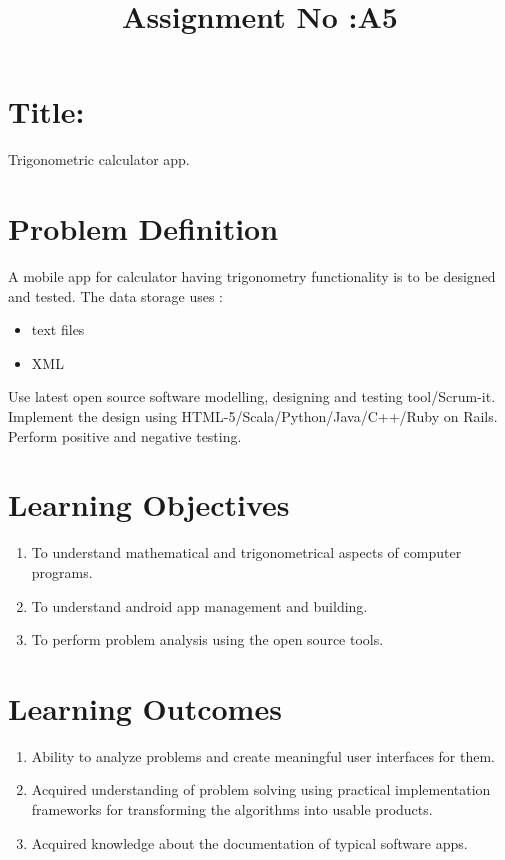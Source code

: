 \documentclass[10pt,a4paper]{article}
\title{Assignment No :A5}
\date{}
\begin{document}
\maketitle
\section{Title:}
Trigonometric calculator app.

\section{Problem Definition}
A mobile app for calculator having trigonometry functionality is to be designed and tested. The data storage uses :
\begin{itemize}
\item text files
\item XML
\end{itemize}
Use latest open source software modelling, designing and testing tool/Scrum-it. Implement the design using HTML-5/Scala/Python/Java/C++/Ruby on Rails. Perform positive and negative testing.

\section{Learning Objectives}
\begin{enumerate}
\item To understand mathematical and trigonometrical aspects of computer programs.
\item To understand android app management and building.
\item To perform problem analysis using the open source tools.
\end{enumerate}

\section{Learning Outcomes}
\begin{enumerate}
\item Ability to analyze problems and create meaningful user interfaces for them.
\item Acquired understanding of problem solving using practical implementation frameworks for transforming the algorithms into usable products.
\item Acquired knowledge about the documentation of typical software apps.
\end{enumerate}
\end{document}
